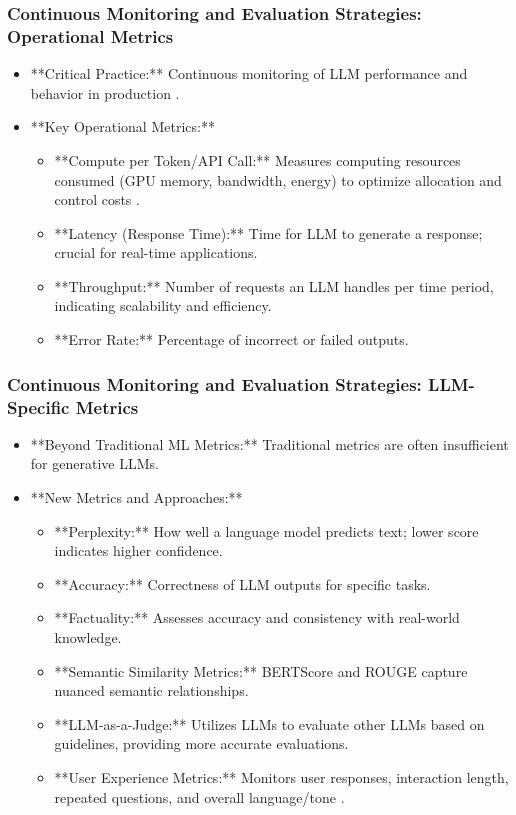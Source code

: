 \documentclass{beamer}       %
\begin{document}
\begin{frame}
    \frametitle{Continuous Monitoring and Evaluation Strategies: Operational Metrics}
    \begin{itemize}
        \item **Critical Practice:** Continuous monitoring of LLM performance and behavior in production .
        \item **Key Operational Metrics:**
        \begin{itemize}
            \item **Compute per Token/API Call:** Measures computing resources consumed (GPU memory, bandwidth, energy) to optimize allocation and control costs .
            \item **Latency (Response Time):** Time for LLM to generate a response; crucial for real-time applications.
            \item **Throughput:** Number of requests an LLM handles per time period, indicating scalability and efficiency.
            \item **Error Rate:** Percentage of incorrect or failed outputs.
        \end{itemize}
    \end{itemize}
\end{frame}

\begin{frame}
    \frametitle{Continuous Monitoring and Evaluation Strategies: LLM-Specific Metrics}
    \begin{itemize}
        \item **Beyond Traditional ML Metrics:** Traditional metrics are often insufficient for generative LLMs.
        \item **New Metrics and Approaches:**
        \begin{itemize}
            \item **Perplexity:** How well a language model predicts text; lower score indicates higher confidence.
            \item **Accuracy:** Correctness of LLM outputs for specific tasks.
            \item **Factuality:** Assesses accuracy and consistency with real-world knowledge.
            \item **Semantic Similarity Metrics:** BERTScore and ROUGE capture nuanced semantic relationships.
            \item **LLM-as-a-Judge:** Utilizes LLMs to evaluate other LLMs based on guidelines, providing more accurate evaluations.
            \item **User Experience Metrics:** Monitors user responses, interaction length, repeated questions, and overall language/tone .
        \end{itemize}
    \end{itemize}
\end{frame}
\end{document}
